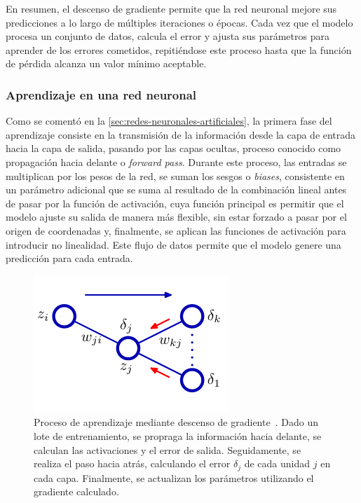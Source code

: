 En resumen, el descenso de gradiente permite que la red neuronal mejore sus predicciones a lo largo de múltiples iteraciones o épocas. Cada vez que el modelo procesa un conjunto de datos, calcula el error y ajusta sus parámetros para aprender de los errores cometidos, repitiéndose este proceso hasta que la función de pérdida alcanza un valor mínimo aceptable.\newline


\subsubsection{Aprendizaje en una red neuronal}

Como se comentó en la \autoref{sec:redes-neuronales-artificiales}, la primera fase del aprendizaje consiste en la transmisión de la información desde la capa de entrada hacia la capa de salida, pasando por las capas ocultas, proceso conocido como propagación hacia delante o \emph{forward pass}. Durante este proceso, las entradas se multiplican por los pesos de la red, se suman los sesgos o \emph{biases}, consistente en un parámetro adicional que se suma al resultado de la combinación lineal antes de pasar por la función de activación, cuya función principal es permitir que el modelo ajuste su salida de manera más flexible, sin estar forzado a pasar por el origen de coordenadas y, finalmente, se aplican las funciones de activación para introducir no linealidad. Este flujo de datos permite que el modelo genere una predicción para cada entrada.\newline

\begin{figure}[h]
    \centering
    \includegraphics[width=0.3\linewidth]{img/aprendizajegd.png}
    \caption[Proceso de aprendizaje mediante descenso de gradiente~\cite{Bishop2006}.]{Proceso de aprendizaje mediante descenso de gradiente~\cite{Bishop2006}. Dado un lote de entrenamiento, se propraga la información hacia delante, se calculan las activaciones y el error de salida. Seguidamente, se realiza el paso hacia atrás, calculando el error $\delta_j$ de cada unidad $j$ en cada capa. Finalmente, se actualizan los parámetros utilizando el gradiente calculado.}\label{fig:aprendizajegd}
\end{figure}


